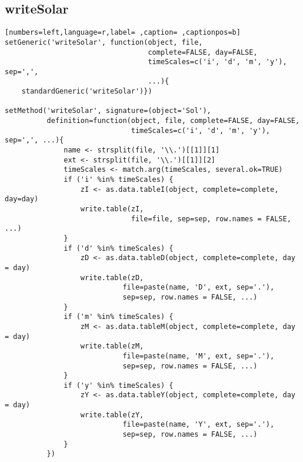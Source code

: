 \subsection{writeSolar}
\label{sec:org82d1a2c}
\begin{lstlisting}[numbers=left,language=r,label= ,caption= ,captionpos=b]
setGeneric('writeSolar', function(object, file,
                                  complete=FALSE, day=FALSE,
                                  timeScales=c('i', 'd', 'm', 'y'), sep=',',
                                  ...){
    standardGeneric('writeSolar')})

setMethod('writeSolar', signature=(object='Sol'),
          definition=function(object, file, complete=FALSE, day=FALSE,
                              timeScales=c('i', 'd', 'm', 'y'), sep=',', ...){
              name <- strsplit(file, '\\.')[[1]][1]
              ext <- strsplit(file, '\\.')[[1]][2]
              timeScales <- match.arg(timeScales, several.ok=TRUE)
              if ('i' %in% timeScales) {
                  zI <- as.data.tableI(object, complete=complete, day=day)
                  write.table(zI,
                              file=file, sep=sep, row.names = FALSE, ...)
              }
              if ('d' %in% timeScales) {
                  zD <- as.data.tableD(object, complete=complete, day = day)
                  write.table(zD,
                            file=paste(name, 'D', ext, sep='.'),
                            sep=sep, row.names = FALSE, ...)
              }
              if ('m' %in% timeScales) {
                  zM <- as.data.tableM(object, complete=complete, day = day)
                  write.table(zM,
                            file=paste(name, 'M', ext, sep='.'),
                            sep=sep, row.names = FALSE, ...)
              }
              if ('y' %in% timeScales) {
                  zY <- as.data.tableY(object, complete=complete, day = day)
                  write.table(zY,
                            file=paste(name, 'Y', ext, sep='.'),
                            sep=sep, row.names = FALSE, ...)
              }
          })
\end{lstlisting}
